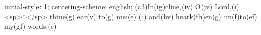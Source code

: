 initial-style: 1;
centering-scheme: english;
(c3)In(ig)cline,(iv) O(jv) Lord,(i) <sp>*</sp> thine(g) ear(v) to(g) me:(e) (;) and(hv) heark(fh)en(g) un(f)to(ef) my(gf) words.(e)
